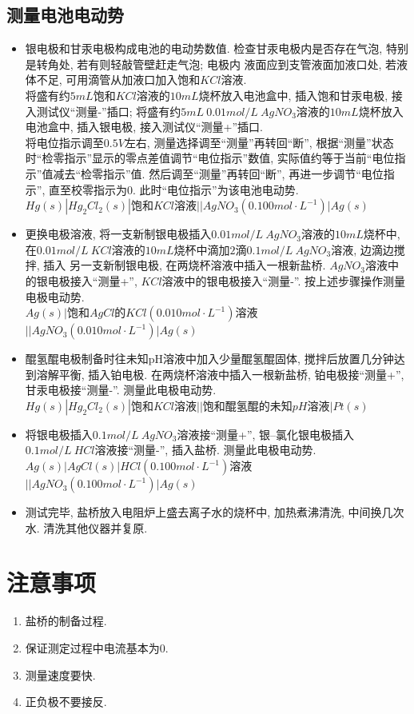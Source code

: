 \documentclass[a4paper]{article}
\begin{document}
\subsection{测量电池电动势}
\begin{itemize}
	\item 银电极和甘汞电极构成电池的电动势数值.
	检查甘汞电极内是否存在气泡, 特别是转角处, 若有则轻敲管壁赶走气泡; 电极内
	液面应到支管液面加液口处, 若液体不足, 可用滴管从加液口加入饱和$KCl$溶液.\\
	将盛有约$5mL$饱和$KCl$溶液的$10mL$烧杯放入电池盒中, 插入饱和甘汞电极, 接入测试仪``测量-''插口; 
	将盛有约$5mL~0.01mol/L~AgNO_{3}$溶液的$10mL$烧杯放入电池盒中, 插入银电极, 接入测试仪``测量+''插口. \\
	将电位指示调至$0.5V$左右, 测量选择调至``测量''再转回``断'', 
	根据``测量''状态时``检零指示''显示的零点差值调节``电位指示''数值, 实际值约等于当前``电位指示''值减去``检零指示''值.
	然后调至``测量''再转回``断'', 再进一步调节``电位指示'', 直至校零指示为0. 此时``电位指示''为该电池电动势.\\
	$Hg(s)|Hg_{2}Cl_{2}(s)|$饱和$KCl$溶液$||AgNO_{3}(0.100mol\cdot L^{-1})|Ag(s)$
	\item 更换电极溶液, 将一支新制银电极插入$0.01mol/L~AgNO_{3}$溶液的$10mL$烧杯中, 
	在$0.01mol/L~KCl$溶液的$10mL$烧杯中滴加$2$滴$0.1mol/L~AgNO_{3}$溶液, 边滴边搅拌, 插入
	另一支新制银电极, 在两烧杯溶液中插入一根新盐桥. $AgNO_{3}$溶液中的银电极接入``测量+'', 
	$KCl$溶液中的银电极接入``测量-''. 按上述步骤操作测量电极电动势. \\
	$Ag(s)|$饱和$AgCl$的$KCl(0.010mol\cdot L^{-1})$溶液$||AgNO_{3}(0.010mol\cdot L^{-1})|Ag(s)$
	\item 醌氢醌电极制备时往未知pH溶液中加入少量醌氢醌固体, 搅拌后放置几分钟达到溶解平衡, 
	插入铂电极. 在两烧杯溶液中插入一根新盐桥, 铂电极接``测量+'', 甘汞电极接``测量-''. 测量此电极电动势.\\
	$Hg(s)|Hg_{2}Cl_{2}(s)|$饱和$KCl$溶液$||$饱和醌氢醌的未知$pH$溶液$|Pt(s)$
	\item 将银电极插入$0.1mol/L~AgNO_{3}$溶液接``测量+'', 银--氯化银电极插入$0.1mol/L~HCl$溶液接``测量-'', 
	插入盐桥. 测量此电极电动势.\\
	$Ag(s)|AgCl(s)|HCl(0.100mol\cdot L^{-1})$溶液$||AgNO_{3}(0.100mol\cdot L^{-1})|Ag(s)$
	\item 测试完毕, 盐桥放入电阻炉上盛去离子水的烧杯中, 加热煮沸清洗, 中间换几次水. 
	清洗其他仪器并复原.
\end{itemize}
\section{注意事项}
\begin{enumerate}
	\item 盐桥的制备过程.
	\item 保证测定过程中电流基本为0.
	\item 测量速度要快.
	\item 正负极不要接反.
\end{enumerate}
\end{document}
